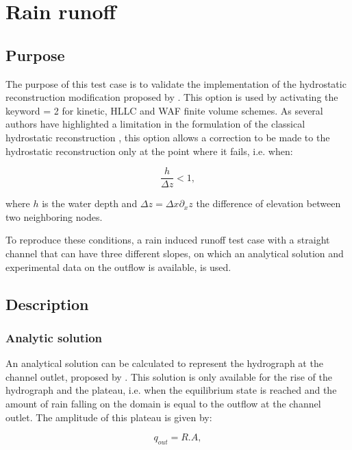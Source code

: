\chapter{Rain runoff}\label{chapter:rain_runoff}

\section{Purpose}

The purpose of this test case is to validate the implementation of the
hydrostatic reconstruction modification proposed by \cite{Chen2017}.
This option is used by activating the keyword
 = 2 for kinetic, HLLC and WAF
finite volume schemes.
As several authors have highlighted a limitation in the formulation of the
classical hydrostatic reconstruction \cite{Delestre2012},
this option allows a correction to be made to the hydrostatic reconstruction
only at the point where it fails, i.e. when:

\begin{equation}
 \frac{h}{\Delta z}<1,
\end{equation}

where $h$ is the water depth and $\Delta z=\Delta x\partial_xz$ the difference
of elevation between two neighboring nodes.

To reproduce these conditions, a rain induced runoff test case with a straight
channel that can have three different slopes, on which an analytical solution
and experimental data on the outflow is available, is used.

\section{Description}

\subsection{Analytic solution}

An analytical solution can be calculated to represent the hydrograph at the
channel outlet, proposed by \cite{Delestre2010}.
This solution is only available for the rise of the hydrograph and the plateau,
i.e. when the equilibrium state is reached and the amount of rain falling on the
domain is equal to the outflow at the channel outlet.
The amplitude of this plateau is given by:

\begin{equation}
 q_{out}=R.A,
\end{equation}

